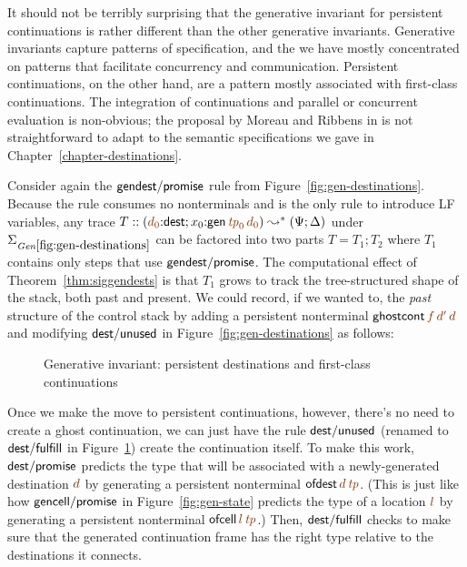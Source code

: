 It should not be terribly surprising that the generative invariant for
persistent continuations is rather different than the other generative
invariants. Generative invariants capture patterns of
specification, and the we have mostly concentrated on patterns that
facilitate
concurrency and communication. Persistent continuations, on the other
hand, are a pattern mostly associated with first-class
continuations. The integration of continuations and parallel or
concurrent evaluation is non-obvious; the proposal by Moreau and
Ribbens in \cite{moreau96semantics} is not straightforward to adapt to
the semantic specifications we gave in
Chapter~\ref{chapter-destinations}.

Consider again the ${\sf gendest/promise}$ rule from
Figure~\ref{fig:gen-destinations}. Because the rule consumes no
nonterminals and is the only rule to introduce LF variables, any trace
$T :: \left(\lf{d_0}{:}{\sf dest}; x_0{:}{\sf gen}\,\lf{{\it
      tp}_0}\,\lf{d_0}\right) \leadsto^* {(\Psi;
  \Delta)}{}$ under $\siggendests$ can be factored into two parts $T =
T_1; T_2$ where $T_1$ contains only steps that use ${\sf
  gendest/promise}$. The computational effect of
Theorem~\ref{thm:siggendests} is that $T_1$ grows to track the
tree-structured shape of the stack, both past and present. We could
record, if we wanted to, the {\it past} structure of the control stack
by adding a persistent nonterminal ${\sf
  ghostcont}\,\lf{f}\,\lf{d'}\,\lf{d}$ and modifying ${\sf dest/unused}$
in Figure~\ref{fig:gen-destinations} as follows:

\smallskip
{}
\smallskip

\begin{figure}[tp]
\caption{Generative invariant: persistent destinations and first-class
  continuations}
\label{fig:gen-letcc2} 
\end{figure}

Once we make the move to persistent continuations, however, there's no
need to create a ghost continuation, we can just have the rule ${\sf
  dest/unused}$ (renamed to ${\sf dest/fulfill}$ in
Figure~\ref{fig:gen-letcc2}) create the continuation itself.  To make
this work, ${\sf dest/promise}$ predicts the type that will be
associated with a newly-generated destination $\lf{d}$ by generating a
persistent nonterminal ${\sf ofdest}\,\lf{d}\,\lf{{\it tp}}$. (This is
just like how ${\sf gencell/promise}$ in Figure~\ref{fig:gen-state}
predicts the type of a location $\lf{l}$ by generating a persistent
nonterminal ${\sf ofcell}\,\lf{l}\,\lf{{\it tp}}$.) Then, ${\sf
  dest/fulfill}$ checks to make sure that the generated continuation
frame has the right type relative to the destinations it connects.

